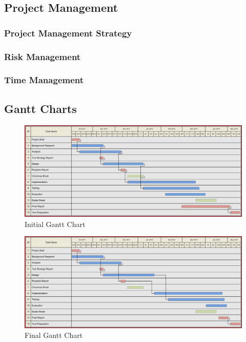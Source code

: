 \subsection{Project Management}

\subsubsection{Project Management Strategy}
\subsubsection{Risk Management}
\subsubsection{Time Management}

\clearpage
\begin{landscape}
\subsection{Gantt Charts}
\begin{figure}[htb]
\centering
\includegraphics[scale=0.75]{img/3yp-gantt.png}
\caption{Initial Gantt Chart}
\label{fig:chart-1}
\end{figure}
\end{landscape}
\clearpage
\begin{landscape}
\begin{figure}[htb]
\centering
\includegraphics[scale=0.75]{img/3yp-gantt-final.png}
\caption{Final Gantt Chart}
\label{fig:chart-2}
\end{figure}
\end{landscape}


